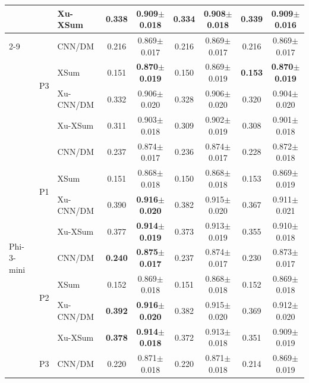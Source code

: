 \begin{table}[b]
{\begin{tabular}{lllcccccc}
 &  & Xu-XSum & 0.338 & \textbf{0.909{\scriptsize$\pm$0.018}} & 0.334 & 0.908{\scriptsize$\pm$0.018} & 0.339 & \textbf{0.909{\scriptsize$\pm$0.016}} \\
\cmidrule(lr){2-9}
 & \multirow{4}{*}{P3} & CNN/DM & 0.216 & 0.869{\scriptsize$\pm$0.017} & 0.216 & 0.869{\scriptsize$\pm$0.017} & 0.216 & 0.869{\scriptsize$\pm$0.017} \\
 &  & XSum & 0.151 & \textbf{0.870{\scriptsize$\pm$0.019}} & 0.150 & 0.869{\scriptsize$\pm$0.019} & \textbf{0.153} & \textbf{0.870{\scriptsize$\pm$0.019}} \\
 &  & Xu-CNN/DM & 0.332 & 0.906{\scriptsize$\pm$0.020} & 0.328 & 0.906{\scriptsize$\pm$0.020} & 0.320 & 0.904{\scriptsize$\pm$0.020} \\
 &  & Xu-XSum & 0.311 & 0.903{\scriptsize$\pm$0.018} & 0.309 & 0.902{\scriptsize$\pm$0.019} & 0.308 & 0.901{\scriptsize$\pm$0.018} \\
\midrule
\multirow{12}{*}{Phi-3-mini} & \multirow{4}{*}{P1} & CNN/DM & 0.237 & 0.874{\scriptsize$\pm$0.017} & 0.236 & 0.874{\scriptsize$\pm$0.017} & 0.228 & 0.872{\scriptsize$\pm$0.018} \\
 &  & XSum & 0.151 & 0.868{\scriptsize$\pm$0.018} & 0.150 & 0.868{\scriptsize$\pm$0.018} & 0.153 & 0.869{\scriptsize$\pm$0.019} \\
 &  & Xu-CNN/DM & 0.390 & \textbf{0.916{\scriptsize$\pm$0.020}} & 0.382 & 0.915{\scriptsize$\pm$0.020} & 0.367 & 0.911{\scriptsize$\pm$0.021} \\
 &  & Xu-XSum & 0.377 & \textbf{0.914{\scriptsize$\pm$0.019}} & 0.373 & 0.913{\scriptsize$\pm$0.019} & 0.355 & 0.910{\scriptsize$\pm$0.018} \\
\cmidrule(lr){2-9}
 & \multirow{4}{*}{P2} & CNN/DM & \textbf{0.240} & \textbf{0.875{\scriptsize$\pm$0.017}} & 0.237 & 0.874{\scriptsize$\pm$0.017} & 0.230 & 0.873{\scriptsize$\pm$0.017} \\
 &  & XSum & 0.152 & 0.869{\scriptsize$\pm$0.018} & 0.151 & 0.868{\scriptsize$\pm$0.018} & 0.152 & 0.869{\scriptsize$\pm$0.018} \\
 &  & Xu-CNN/DM & \textbf{0.392} & \textbf{0.916{\scriptsize$\pm$0.020}} & 0.382 & 0.915{\scriptsize$\pm$0.020} & 0.369 & 0.912{\scriptsize$\pm$0.020} \\
 &  & Xu-XSum & \textbf{0.378} & \textbf{0.914{\scriptsize$\pm$0.018}} & 0.372 & 0.913{\scriptsize$\pm$0.018} & 0.351 & 0.909{\scriptsize$\pm$0.019} \\
\cmidrule(lr){2-9}
 & \multirow{4}{*}{P3} & CNN/DM & 0.220 & 0.871{\scriptsize$\pm$0.018} & 0.220 & 0.871{\scriptsize$\pm$0.018} & 0.214 & 0.869{\scriptsize$\pm$0.019} \\

\end{tabular}}
\end{table}
